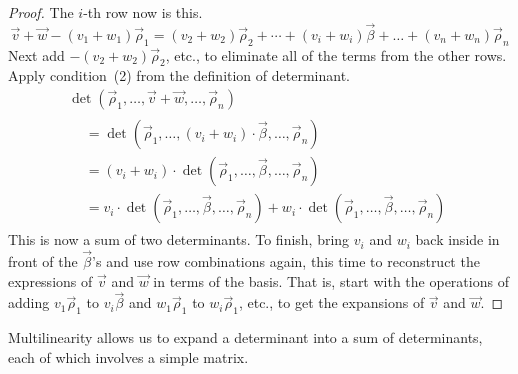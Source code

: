 \begin{proof}
The $i$-th row now is this.
\begin{equation*}
  \vec{v}+\vec{w}-(v_1+w_1)\vec{\rho}_1
  =
  (v_2+w_2)\vec{\rho}_2+\cdots+(v_i+w_i)\vec{\beta}
            +\dots+(v_n+w_n)\vec{\rho}_n 
\end{equation*}
Next add $-(v_2+w_2)\vec{\rho}_2$, etc., to eliminate 
all of the terms from the other rows.
Apply condition~(2) from the definition of determinant.
\begin{multline*}
  \det (\vec{\rho}_1,\dots,\vec{v}+\vec{w},\dots,\vec{\rho}_n)          \\
  \begin{aligned}
    &=\det (\vec{\rho}_1,\dots,(v_i+w_i)\cdot\vec{\beta},\dots,\vec{\rho}_n) \\
    &=(v_i+w_i)\cdot\det (\vec{\rho}_1,\dots,\vec{\beta},\dots,\vec{\rho}_n) \\
    &=v_i\cdot \det (\vec{\rho}_1,\dots,\vec{\beta},\dots,\vec{\rho}_n)  
     +w_i\cdot \det (\vec{\rho}_1,\dots,\vec{\beta},\dots,\vec{\rho}_n)
  \end{aligned}
\end{multline*}
This is now a sum of two determinants.
To finish, bring $v_i$ and $w_i$ back inside in front of the 
$\vec{\beta}$'s
and use row combinations again, 
this time to reconstruct the expressions of $\vec{v}$
and $\vec{w}$ in terms of the basis.
That is, start with the operations
of adding $v_1\vec{\rho}_1$ to $v_i\vec{\beta}$ 
and $w_1\vec{\rho}_1$ to $w_i\vec{\rho}_1$, etc.,
to get the expansions of $\vec{v}$ and $\vec{w}$.
\end{proof}

Multilinearity allows us to expand a determinant into a sum of
determinants, each of which involves a simple matrix.

